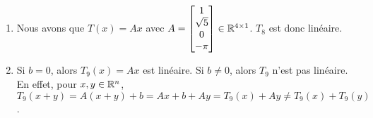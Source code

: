 \begin{exercice}
\begin{enumerate}
    \item Nous avons que $T(x) = Ax$ avec $A = \begin{bmatrix} 1 \\ \sqrt{5} \\ 0 \\ -\pi \end{bmatrix} \in \mathbb{R}^{4 \times 1}$. $T_8$ est donc linéaire.
    
    \item Si $b=0$, alors $T_9 (x) = Ax$ est linéaire. Si $b \neq 0$, alors $T_9$ n'est pas linéaire. En effet, pour $x,y \in \mathbb{R}^n$, $T_9(x+y) = A(x+y) +b = Ax + b + Ay = T_9 (x) + Ay \neq T_9(x) + T_9(y)$. \\
\end{enumerate}
\end{exercice}

